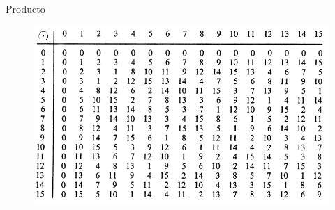 \documentclass[10pt,spanish]{beamer}
\def\N{\mathbb{N}}
\begin{document}
\begin{frame}{Producto}
	\begin{figure}
	\includegraphics[scale=0.5,left]{nim_product.png}
	\end{figure}
\end{frame}



\end{document}
